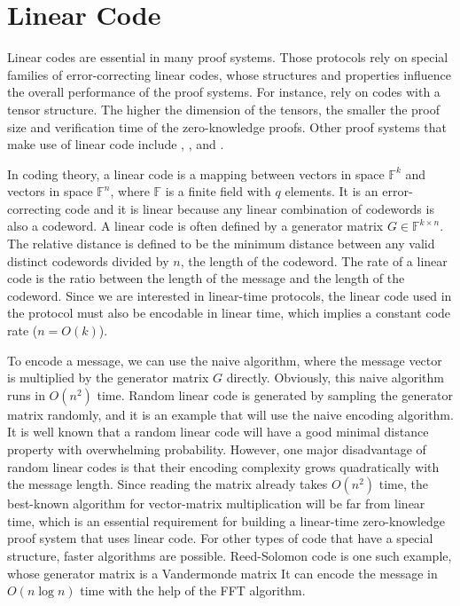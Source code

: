\section{Linear Code}

Linear codes are essential in many proof systems. Those protocols rely on special families of error-correcting linear codes, whose structures and properties influence the overall performance of the proof systems. For instance, \cite{brakedown} \cite{cryptoeprint:2020/1426} \cite{BCL22} rely on codes with a tensor structure. The higher the dimension of the tensors, the smaller the proof size and verification time of the zero-knowledge proofs. Other proof systems that make use of linear code include \cite{DBLP:conf/coco/BordageLNR22}, \cite{DBLP:conf/icalp/Ben-SassonBHR18}, \cite{DBLP:conf/ccs/AmesHIV17} and \cite{DBLP:conf/crypto/Ben-SassonBHR19}.


In coding theory, a linear code is a mapping between vectors in space $\mathbb{F}^k$ and vectors in space $\mathbb{F}^n$, where $\mathbb{F}$ is a finite field with $q$ elements. It is an error-correcting code and it is linear because any linear combination of codewords is also a codeword. A linear code is often defined by a generator matrix $G \in \mathbb{F}^{k \times n}$. The relative distance is defined to be the minimum distance between any valid distinct codewords divided by $n$, the length of the codeword. The rate of a linear code is the ratio between the length of the message and the length of the codeword. Since we are interested in linear-time protocols, the linear code used in the protocol must also be encodable in linear time, which implies a constant code rate ($n = O(k)$).

To encode a message, we can use the naive algorithm, where the message vector is multiplied by the generator matrix $G$ directly. Obviously, this naive algorithm runs in $O(n^2)$ time. 
Random linear code is generated by sampling the generator matrix randomly, and it is an example that will use the naive encoding algorithm. It is well known that a random linear code will have a good minimal distance property with overwhelming probability. However, one major disadvantage of random linear codes is that their encoding complexity grows quadratically with the message length. Since reading the matrix already takes $O(n^2)$ time, the best-known algorithm for vector-matrix multiplication will be far from linear time, which is an essential requirement for building a linear-time zero-knowledge proof system that uses linear code. For other types of code that have a special structure, faster algorithms are possible. Reed-Solomon code is one such example, whose generator matrix is a Vandermonde matrix It can encode the message in $O(n \log n)$ time with the help of the FFT algorithm.



